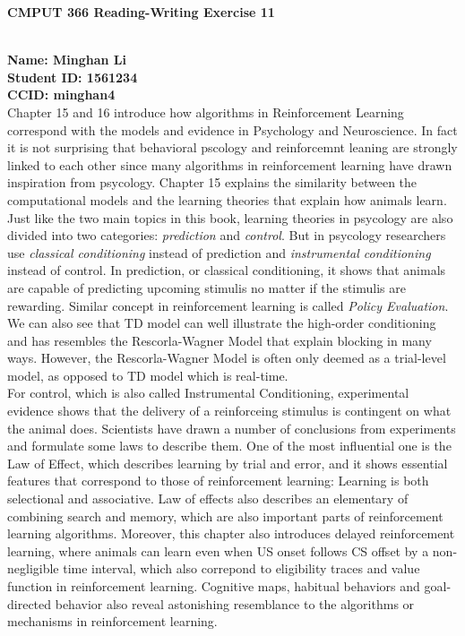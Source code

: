 \documentclass[12pt,a4paper]{article}
\begin{document}
\centerline{\large{\textbf{CMPUT 366 Reading-Writing Exercise 11}}}

\ \\
\noindent \textbf{Name: Minghan Li}\\
\textbf{Student ID: 1561234}\\
\textbf{CCID: minghan4}\\

Chapter 15 and 16 introduce how algorithms in Reinforcement Learning correspond with the models and evidence in Psychology and Neuroscience. In fact it is not surprising that behavioral pscology and reinforcemnt leaning are strongly linked to each other since many algorithms in reinforcement learning have drawn inspiration from psycology. Chapter 15 explains the similarity between the computational models and the learning theories that explain how animals learn. Just like the two main topics in this book, learning theories in psycology are also divided into two categories: \textit{prediction} and \textit{control}. But in psycology researchers use \textit{classical conditioning} instead of prediction and \textit{instrumental conditioning} instead of control. In prediction, or classical conditioning,  it shows that animals are capable of predicting upcoming stimulis no matter if the stimulis are rewarding. Similar concept in reinforcement learning is called \textit{Policy Evaluation}. We can also see that TD model can well illustrate the high-order conditioning and has resembles the Rescorla-Wagner Model that explain blocking in many ways. However, the Rescorla-Wagner Model is often only deemed as a trial-level model, as opposed to TD model which is real-time.\\

For control, which is also called Instrumental Conditioning, experimental evidence shows that the delivery of a reinforceing stimulus is contingent on what the animal does. Scientists have drawn a number of conclusions from experiments and formulate some laws to describe them. One of the most influential one is the Law of Effect, which describes learning by trial and error, and it shows essential features that correspond to those of reinforcement learning: Learning is both selectional and associative. Law of effects also describes an elementary of combining search and memory, which are also important parts of reinforcement learning algorithms. Moreover, this chapter also introduces delayed reinforcement learning, where animals can learn even when US onset follows CS offset by a non-negligible time interval, which also correpond to eligibility traces and value function in reinforcement learning. Cognitive maps, habitual behaviors and goal-directed behavior also reveal astonishing resemblance to the algorithms or mechanisms in reinforcement learning.\\
\end{document}
